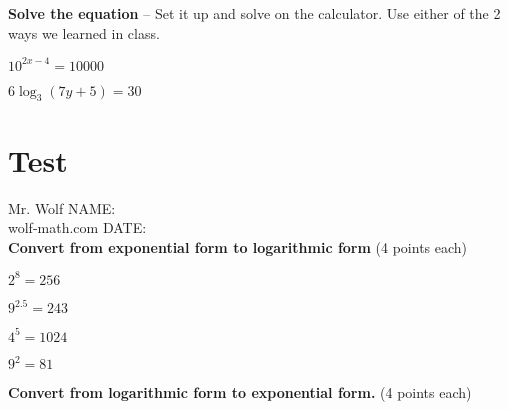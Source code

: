 \documentclass[12pt]{article}
\begin{document}
\textbf{Solve the equation} -- Set it up and solve on the calculator. Use either of the 2 ways we learned in class.\\

\begin{enumerate}[resume]
\begin{multicols}{2}
	\setlength\itemsep{2cm}
	

	\item $10^{2x-4}=10000$\\
	
	\item $6\log_{3}(7y+5)=30$\\
	

\end{multicols}
\end{enumerate}

\section{Test}

\vspace{12pt}

Mr. Wolf \hfill NAME:\underline{\hspace{3in}}\\ 
wolf-math.com \hfill DATE:\underline{\hspace{2in}}\\

\textbf{Convert from exponential form to logarithmic form} (4 points each)\\

\begin{enumerate}
\begin{multicols}{2}
	\setlength\itemsep{2cm}
	
	\item $2^{8}=256$\\
	
	\item $9^{2.5}=243$\\
	
	\item $4^5=1024$\\
	
	\item $9^2=81$\\

\end{multicols}
\end{enumerate}

\textbf{Convert from logarithmic form to exponential form.} (4 points each)\\
\end{document}
